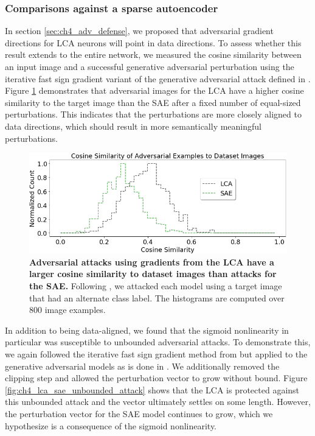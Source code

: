 \subsubsection{Comparisons against a sparse autoencoder}
In section \ref{sec:ch4_adv_defense}, we proposed that adversarial gradient directions for LCA neurons will point in data directions. To assess whether this result extends to the entire network, we measured the cosine similarity between an input image and a successful generative adversarial perturbation using the iterative fast sign gradient \parencite{kurakin2016adversarial} variant of the generative adversarial attack defined in \parencite{kos2018adversarial}. Figure \ref{fig:ch4_cosine_similarity} demonstrates that adversarial images for the LCA have a higher cosine similarity to the target image than the SAE after a fixed number of equal-sized perturbations. This indicates that the perturbations are more closely aligned to data directions, which should result in more semantically meaningful perturbations.

\begin{figure}[h]
    \begin{center}
    \centerline{\includegraphics[width=\columnwidth]{figures/cosyne_similarity.png}}
    \end{center}
    \caption{\textbf{Adversarial attacks using gradients from the LCA have a larger cosine similarity to dataset images than attacks for the SAE.} Following \parencite{kos2018adversarial, kurakin2016adversarial}, we attacked each model using a target image that had an alternate class label. The histograms are computed over 800 image examples.}
    \label{fig:ch4_cosine_similarity}
\end{figure}

In addition to being data-aligned, we found that the sigmoid nonlinearity in particular was susceptible to unbounded adversarial attacks. To demonstrate this, we again followed the iterative fast sign gradient method from \parencite{kurakin2016adversarial} but applied to the generative adversarial models as is done in \parencite{kos2018adversarial}. We additionally removed the clipping step and allowed the perturbation vector to grow without bound. Figure \ref{fig:ch4_lca_sae_unbounded_attack} shows that the LCA is protected against this unbounded attack and the vector ultimately settles on some length. However, the perturbation vector for the SAE model continues to grow, which we hypothesize is a consequence of the sigmoid nonlinearity.

